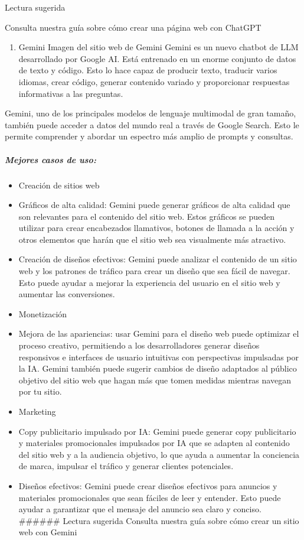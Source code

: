 \documentclass[a4paper12pt]{article}
\providecommand{\tightlist}{%
      \setlength{\itemsep}{0pt}\setlength{\parskip}{0pt}}
\begin{document}
Lectura sugerida

Consulta nuestra guía sobre cómo crear una página web con ChatGPT

\begin{enumerate}
\def\labelenumi{\arabic{enumi}.}
\setcounter{enumi}{2}
\tightlist
\item
  Gemini Imagen del sitio web de Gemini Gemini es un nuevo chatbot de
  LLM desarrollado por Google AI. Está entrenado en un enorme conjunto
  de datos de texto y código. Esto lo hace capaz de producir texto,
  traducir varios idiomas, crear código, generar contenido variado y
  proporcionar respuestas informativas a las preguntas.
\end{enumerate}

Gemini, uno de los principales modelos de lenguaje multimodal de gran
tamaño, también puede acceder a datos del mundo real a través de Google
Search. Esto le permite comprender y abordar un espectro más amplio de
prompts y consultas.

\hypertarget{mejores-casos-de-uso-2}{%
\subparagraph{Mejores casos de uso:}\label{mejores-casos-de-uso-2}}

\begin{itemize}
\item
  Creación de sitios web
\item
  Gráficos de alta calidad: Gemini puede generar gráficos de alta
  calidad que son relevantes para el contenido del sitio web. Estos
  gráficos se pueden utilizar para crear encabezados llamativos, botones
  de llamada a la acción y otros elementos que harán que el sitio web
  sea visualmente más atractivo.
\item
  Creación de diseños efectivos: Gemini puede analizar el contenido de
  un sitio web y los patrones de tráfico para crear un diseño que sea
  fácil de navegar. Esto puede ayudar a mejorar la experiencia del
  usuario en el sitio web y aumentar las conversiones.
\item
  Monetización
\item
  Mejora de las apariencias: usar Gemini para el diseño web puede
  optimizar el proceso creativo, permitiendo a los desarrolladores
  generar diseños responsivos e interfaces de usuario intuitivas con
  perspectivas impulsadas por la IA. Gemini también puede sugerir
  cambios de diseño adaptados al público objetivo del sitio web que
  hagan más que tomen medidas mientras navegan por tu sitio.
\item
  Marketing
\item
  Copy publicitario impulsado por IA: Gemini puede generar copy
  publicitario y materiales promocionales impulsados por IA que se
  adapten al contenido del sitio web y a la audiencia objetivo, lo que
  ayuda a aumentar la conciencia de marca, impulsar el tráfico y generar
  clientes potenciales.
\item
  Diseños efectivos: Gemini puede crear diseños efectivos para anuncios
  y materiales promocionales que sean fáciles de leer y entender. Esto
  puede ayudar a garantizar que el mensaje del anuncio sea claro y
  conciso. \#\#\#\#\#\# Lectura sugerida Consulta nuestra guía sobre
  cómo crear un sitio web con Gemini
\end{itemize}
\end{document}
